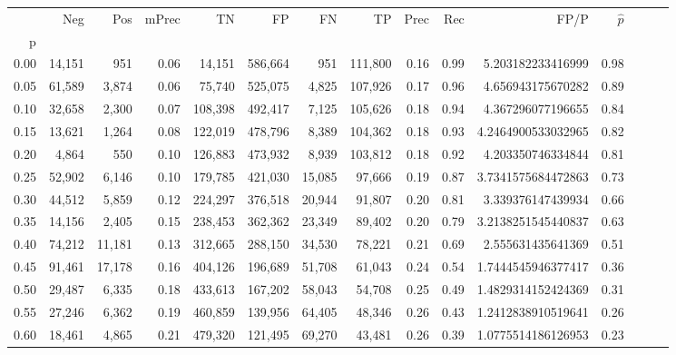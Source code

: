 \begin{tabular}{rrrrrrrrrrrrrrr}
\toprule
{} &     Neg &     Pos & mPrec &       TN &       FP &       FN &       TP &  Prec &   Rec &                 FP/P & $\hat{p}$ \\
p    &         &         &       &          &          &          &          &       &       &                      &           \\
\midrule
0.00 &  14,151 &     951 &  0.06 &   14,151 &  586,664 &      951 &  111,800 &  0.16 &  0.99 &    5.203182233416999 &      0.98 \\
0.05 &  61,589 &   3,874 &  0.06 &   75,740 &  525,075 &    4,825 &  107,926 &  0.17 &  0.96 &    4.656943175670282 &      0.89 \\
0.10 &  32,658 &   2,300 &  0.07 &  108,398 &  492,417 &    7,125 &  105,626 &  0.18 &  0.94 &    4.367296077196655 &      0.84 \\
0.15 &  13,621 &   1,264 &  0.08 &  122,019 &  478,796 &    8,389 &  104,362 &  0.18 &  0.93 &   4.2464900533032965 &      0.82 \\
0.20 &   4,864 &     550 &  0.10 &  126,883 &  473,932 &    8,939 &  103,812 &  0.18 &  0.92 &    4.203350746334844 &      0.81 \\
0.25 &  52,902 &   6,146 &  0.10 &  179,785 &  421,030 &   15,085 &   97,666 &  0.19 &  0.87 &   3.7341575684472863 &      0.73 \\
0.30 &  44,512 &   5,859 &  0.12 &  224,297 &  376,518 &   20,944 &   91,807 &  0.20 &  0.81 &    3.339376147439934 &      0.66 \\
0.35 &  14,156 &   2,405 &  0.15 &  238,453 &  362,362 &   23,349 &   89,402 &  0.20 &  0.79 &   3.2138251545440837 &      0.63 \\
0.40 &  74,212 &  11,181 &  0.13 &  312,665 &  288,150 &   34,530 &   78,221 &  0.21 &  0.69 &    2.555631435641369 &      0.51 \\
0.45 &  91,461 &  17,178 &  0.16 &  404,126 &  196,689 &   51,708 &   61,043 &  0.24 &  0.54 &   1.7444545946377417 &      0.36 \\
0.50 &  29,487 &   6,335 &  0.18 &  433,613 &  167,202 &   58,043 &   54,708 &  0.25 &  0.49 &   1.4829314152424369 &      0.31 \\
0.55 &  27,246 &   6,362 &  0.19 &  460,859 &  139,956 &   64,405 &   48,346 &  0.26 &  0.43 &   1.2412838910519641 &      0.26 \\
0.60 &  18,461 &   4,865 &  0.21 &  479,320 &  121,495 &   69,270 &   43,481 &  0.26 &  0.39 &   1.0775514186126953 &      0.23 \\

\end{tabular}
